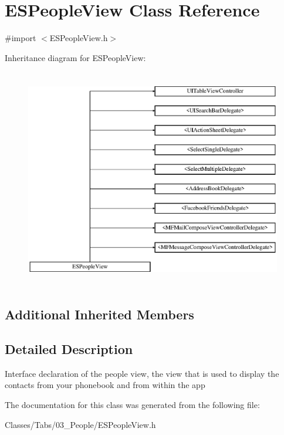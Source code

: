 \hypertarget{interface_e_s_people_view}{}\section{E\+S\+People\+View Class Reference}
\label{interface_e_s_people_view}


{\ttfamily \#import $<$E\+S\+People\+View.\+h$>$}

Inheritance diagram for E\+S\+People\+View\+:\begin{figure}[H]
\begin{center}
\leavevmode
\includegraphics[height=9.655172cm]{interface_e_s_people_view}
\end{center}
\end{figure}
\subsection*{Additional Inherited Members}


\subsection{Detailed Description}
Interface declaration of the people view, the view that is used to display the contacts from your phonebook and from within the app 

The documentation for this class was generated from the following file\+:\begin{DoxyCompactItemize}
\item 
Classes/\+Tabs/03\+\_\+\+People/E\+S\+People\+View.\+h\end{DoxyCompactItemize}
